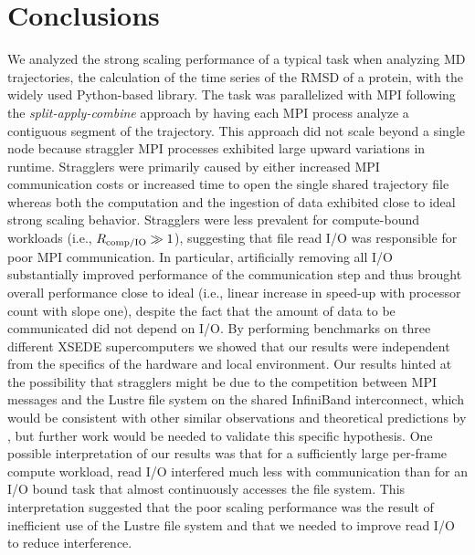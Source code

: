 
\section{Conclusions}
\label{sec:conclusions}

We analyzed the strong scaling performance of a typical task when analyzing MD trajectories, the calculation of the time series of the RMSD of a protein, with the widely used Python-based  library.
The task was parallelized with MPI following the \emph{split-apply-combine} approach by having each MPI process analyze a contiguous segment of the trajectory.
This approach did not scale beyond a single node because straggler MPI processes exhibited large upward variations in runtime.
Stragglers were primarily caused by either increased MPI communication costs or increased time to open the single shared trajectory file whereas both the computation and the ingestion of data exhibited close to ideal strong scaling behavior.
Stragglers were less prevalent for compute-bound workloads (i.e., $R_{\text{comp/IO}} \gg 1$), suggesting that file read I/O was responsible for poor MPI communication.
In particular, artificially removing all I/O substantially improved performance of the communication step and thus brought overall performance close to ideal (i.e., linear increase in speed-up with processor count with slope one), despite the fact that the amount of data to be communicated did not depend on I/O.
By performing benchmarks on three different XSEDE supercomputers we showed that our results were independent from the specifics of the hardware and local environment.
Our results hinted at the possibility that stragglers might be due to the competition between MPI messages and the Lustre file system on the shared InfiniBand interconnect, which would be consistent with other similar observations \cite{VMD2013} and theoretical predictions by \citet{Brown:2018ab}, but further work would be needed to validate this specific hypothesis.
One possible interpretation of our results was that for a sufficiently large per-frame compute workload, read I/O interfered much less with communication than for an I/O bound task that almost continuously accesses the file system.
This interpretation suggested that the poor scaling performance was the result of inefficient use of the Lustre file system and that we needed to improve read I/O to reduce interference.

